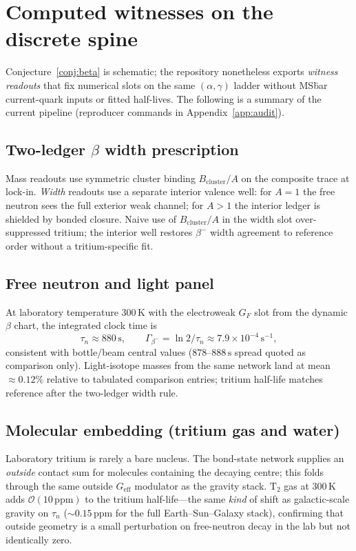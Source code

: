 \documentclass[11pt,a4paper]{article}
\theoremstyle{plain}
\theoremstyle{definition}
\theoremstyle{remark}
\theoremstyle{plain}
\theoremstyle{definition}
\begin{document}
\section{Computed witnesses on the discrete spine}
\label{sec:witnesses}

Conjecture~\ref{conj:beta} is schematic; the repository nonetheless exports \emph{witness readouts} that fix numerical slots on the same $(\alpha,\gamma)$ ladder without MS\=bar current-quark inputs or fitted half-lives.
The following is a summary of the current pipeline (reproducer commands in Appendix~\ref{app:audit}).

\subsection{Two-ledger $\beta$ width prescription}

Mass readouts use symmetric cluster binding $B_{\mathrm{cluster}}/A$ on the composite trace at lock-in.
\emph{Width} readouts use a separate interior valence well: for $A=1$ the free neutron sees the full exterior weak channel; for $A>1$ the interior ledger is shielded by bonded closure.
Naive use of $B_{\mathrm{cluster}}/A$ in the width slot over-suppressed tritium; the interior well restores $\beta^-$ width agreement to reference order without a tritium-specific fit.

\subsection{Free neutron and light panel}

At laboratory temperature $300\,\mathrm{K}$ with the electroweak $G_F$ slot from the dynamic $\beta$ chart, the integrated clock time is
\[
  \tau_n \approx 880\,\mathrm{s},
  \qquad
  \Gamma_{\beta^-} = \ln 2 / \tau_n \approx 7.9\times 10^{-4}\,\mathrm{s}^{-1},
\]
consistent with bottle/beam central values ($878$--$888\,\mathrm{s}$ spread quoted as comparison only).
Light-isotope masses from the same network land at mean $\approx 0.12\%$ relative to tabulated comparison entries; tritium half-life matches reference after the two-ledger width rule.

\subsection{Molecular embedding (tritium gas and water)}

Laboratory tritium is rarely a bare nucleus.
The bond-state network supplies an \emph{outside} contact sum for molecules containing the decaying centre; this folds through the same outside $G_{\mathrm{eff}}$ modulator as the gravity stack.
$\mathrm{T_2}$ gas at $300\,\mathrm{K}$ adds $\mathcal{O}(10\,\mathrm{ppm})$ to the tritium half-life---the same \emph{kind} of shift as galactic-scale gravity on $\tau_n$ ($\sim 0.15\,\mathrm{ppm}$ for the full Earth--Sun--Galaxy stack), confirming that outside geometry is a small perturbation on free-neutron decay in the lab but not identically zero.
\end{document}
